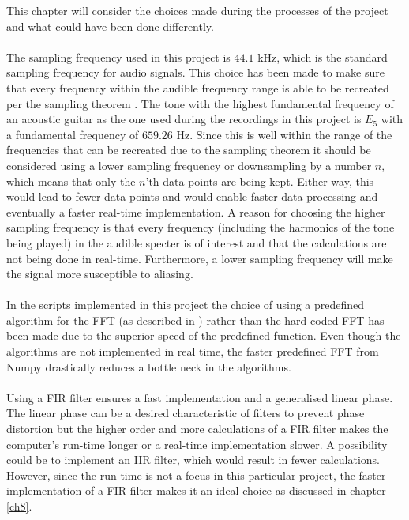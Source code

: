 This chapter will consider the choices made during the processes of the project and what could have been done differently.
\\ \\
The sampling frequency used in this project is $44.1$ kHz, which is the standard sampling frequency for audio signals.
This choice has been made to make sure that every frequency within the audible frequency range is able to be recreated per the sampling theorem .
The tone with the highest fundamental frequency of an acoustic guitar as the one used during the recordings in this project is $E_5$ with a fundamental frequency of $659.26$ Hz.
Since this is well within the range of the frequencies that can be recreated due to the sampling theorem it should be considered using a lower sampling frequency or downsampling by a number $n$, which means that only the $n$'th data points are being kept. Either way, this would lead to fewer data points and would enable faster data processing and eventually a faster real-time implementation.
A reason for choosing the higher sampling frequency is that every frequency (including the harmonics of the tone being played) in the audible specter is of interest and that the calculations are not being done in real-time.
Furthermore, a lower sampling frequency will make the signal more susceptible to aliasing. %
\\ \\
In the scripts implemented in this project the choice of using a predefined algorithm for the FFT (as described in ) rather than the hard-coded FFT has been made due to the superior speed of the predefined function. Even though the algorithms are not implemented in real time, the faster predefined FFT from Numpy drastically reduces a bottle neck in the algorithms.
\\ \\
Using a FIR filter ensures a fast implementation and a generalised linear phase. The linear phase can be a desired characteristic of filters to prevent phase distortion but the higher order and more calculations of a FIR filter makes the computer's run-time longer or a real-time implementation slower. A possibility could be to implement an IIR filter, which would result in fewer calculations. However, since the run time is not a focus in this particular project, the faster implementation of a FIR filter makes it an ideal choice as discussed in chapter \ref{ch8}.
